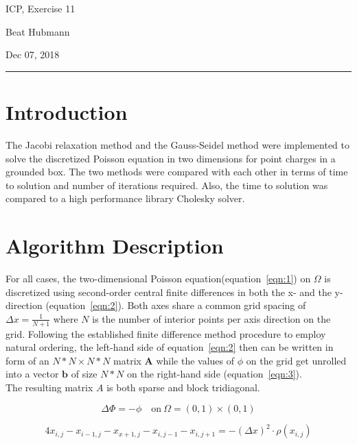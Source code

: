 \documentclass[11pt,a4paper]{article}
\renewcommand{\vec}[1]{\mathbf{#1}}
\begin{document}
\noindent\parbox{\linewidth}{
 \parbox{.25\linewidth}{ \large ICP, Exercise 11 }\hfill
 \parbox{.5\linewidth}{\begin{center} \large Beat Hubmann \end{center}}\hfill
 \parbox{.2\linewidth}{\begin{flushright} \large Dec 07, 2018 \end{flushright}}
}
\noindent\rule{\linewidth}{2pt}


\section{Introduction}

The Jacobi relaxation method and the Gauss-Seidel method were implemented to solve
the discretized Poisson equation in two dimensions for point charges in a grounded box.
The two methods were compared with each other in terms of time to solution and number of iterations required.
Also, the time to solution was compared to a high performance library Cholesky solver.

\section{Algorithm Description}

For all cases, the two-dimensional Poisson equation(equation~\ref{eqn:1}) on $\Omega$ is 
discretized using second-order central finite differences in both the x- and the y-direction (equation~\ref{eqn:2}).
Both axes share a common grid spacing of $\Delta x= \frac{1}{N+1}$ where $N$ is the number of interior points
per axis direction on the grid.
Following the established finite difference method procedure to employ natural ordering, the left-hand side of equation~\ref{eqn:2} then can be written
in form of an $N*N \times N*N$ matrix $\vec{A}$ while the values of $\phi$ on the grid get unrolled into a vector $\vec{b}$ of size $N*N$ on the right-hand side (equation~\ref{eqn:3}).\\
The resulting matrix $A$ is both sparse and block tridiagonal.



\begin{equation}
\Delta \Phi = -\phi \quad \text{on}\ \Omega = (0, 1) \times (0,1)
\label{eqn:1}
\end{equation}


\begin{equation}
4x_{i,j} - x_{i-1, j} - x_{x+1, j} - x_{i, j-1} - x_{i, j+1} = -(\Delta x)^2 \cdot \rho(x_{i,j})
\label{eqn:2}
\end{equation}
\end{document}
